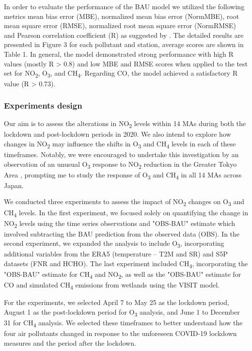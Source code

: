 In order to evaluate the performance of the BAU model we utilized the following metrics mean bias error (MBE), normalized mean bias error (NormMBE), root mean square error (RMSE), normalized root mean square error (NormRMSE) and Pearson correlation coefficient (R) as suggested by \citep{grange2021covid}. The detailed results are presented in Figure 3 for each pollutant and station, average scores are shown in Table 1. In general, the model demonstrated strong performance with high R values (mostly R > 0.8) and low MBE and RMSE scores when applied to the test set for NO\textsubscript{2}, O\textsubscript{3}, and CH\textsubscript{4}. Regarding CO, the model achieved a satisfactory R value (R > 0.73).\par

\subsubsection*{Experiments design}
Our aim is to assess the alterations in NO\textsubscript{2} levels within 14 MAs during both the lockdown and post-lockdown periods in 2020. We also intend to explore how changes in NO\textsubscript{2} may influence the shifts in O\textsubscript{3} and CH\textsubscript{4} levels in each of these timeframes. Notably, we were encouraged to undertake this investigation by an observation of an unusual O\textsubscript{3} response to NO\textsubscript{2} reduction in the Greater Tokyo Area \citep{damiani2022peculiar}, prompting me to study the response of O\textsubscript{3} and CH\textsubscript{4} in all 14 MAs across Japan. \par
We conducted three experiments to assess the impact of NO\textsubscript{2} changes on O\textsubscript{3} and CH\textsubscript{4} levels. In the first experiment, we focused solely on quantifying the change in NO\textsubscript{2} levels using the time series observations and "OBS-BAU" estimate which involved subtracting the BAU prediction from the observed data (OBS). In the second experiment, we expanded the analysis to include O\textsubscript{3}, incorporating additional variables  from the ERA5 (temperature – T2M and SR) and S5P datasets (FNR and HCHO). The last experiment included CH\textsubscript{4}, incorporating the "OBS-BAU" estimate for CH\textsubscript{4} and NO\textsubscript{2}, as well as the "OBS-BAU" estimate for CO and simulated CH\textsubscript{4} emissions from wetlands using the VISIT model. \par
For the experiments, we selected April 7 to May 25 as the lockdown period, August 1 as the post-lockdown period for O\textsubscript{3} analysis, and June 1 to December 31 for CH\textsubscript{4} analysis. We selected these timeframes to better understand how the four air pollutants changed in response to the unforeseen COVID-19 lockdown measures and the period after the lockdown. \par

